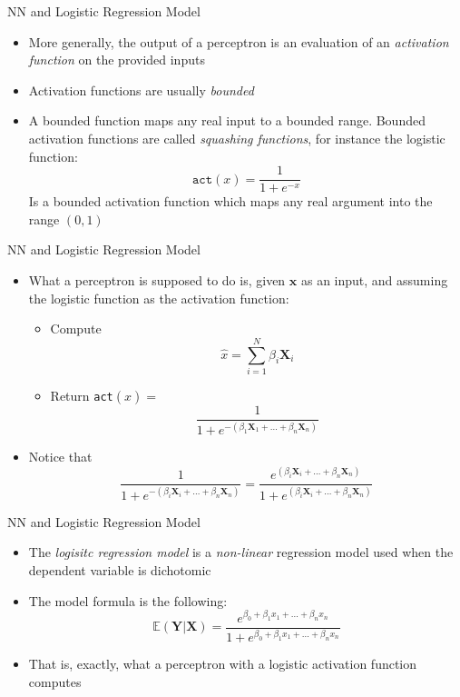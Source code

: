 \documentclass[xcolor ={table,usenames,dvipsnames}]{beamer}
\theoremstyle{definition}
\begin{document}
\begin{frame}{NN and Logistic Regression Model}
\begin{itemize}
	\item More generally, the output of a perceptron is an evaluation of an \emph{activation function} on the provided inputs
	\item Activation functions are usually \emph{bounded}
	\item A bounded function maps any real input to a bounded range. Bounded activation functions are called \emph{squashing functions}, for instance the logistic function:
	$$
	\texttt{act}(x) = \dfrac{1}{1+e^{-x}}
	$$
	Is a bounded activation function which maps any real argument into the range $(0,1)$
\end{itemize}
\end{frame}
\begin{frame}{NN and Logistic Regression Model}
\begin{itemize}
	\item What a perceptron is supposed to do is, given $\textbf{x}$ as an input, and assuming the logistic function as the activation function:
	\begin{itemize}
		\item Compute $$\hat x = \sum_{i=1}^N \beta_i \textbf{X}_i$$
		\item Return \texttt{act}$(\hat x) =$ $$ \dfrac{1}{1+e^{-(\beta_1\textbf{X}_1+ \dots + \beta_n\textbf{X}_n)}}$$
	\end{itemize}
\item Notice that 
$$
\dfrac{1}{1+e^{-(\beta_i\textbf{X}_i+ \dots + \beta_n\textbf{X}_n)}} =\dfrac{e^{(\beta_i\textbf{X}_i+ \dots + \beta_n\textbf{X}_n)}}{1+e^{(\beta_i\textbf{X}_i+ \dots + \beta_n\textbf{X}_n)}}
$$
\end{itemize}
\end{frame}
\begin{frame}{NN and Logistic Regression Model}
\begin{itemize}
	\item The \emph{logisitc regression model} is a \emph{non-linear} regression model used when the dependent variable is dichotomic
	\item The model formula is the following:
	$$
	\mathbb{E}(\textbf{Y}|\textbf{X}) = \dfrac{e^{\beta_0 + \beta_1x_1+\dots+\beta_n x_n}}{1 +e^{\beta_0 + \beta_1x_1+\dots+\beta_n x_n} }
	$$
	\item That is, exactly, what a perceptron with a logistic activation function computes
\end{itemize}
\end{frame}
\end{document}

